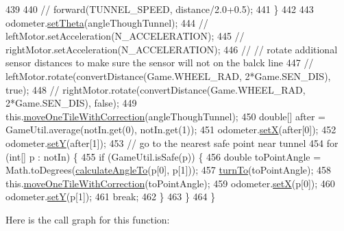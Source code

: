 \begin{DoxyCode}
439        
440 \textcolor{comment}{//        forward(TUNNEL\_SPEED, distance/2.0+0.5);}
441       \}
442 
443     odometer.\hyperlink{classca_1_1mcgill_1_1ecse211_1_1odometer_1_1_odometer_data_a419b8f07c2c5374411c8e62298e9a402}{setTheta}(angleThoughTunnel);
444 \textcolor{comment}{//    leftMotor.setAcceleration(N\_ACCELERATION);}
445 \textcolor{comment}{//    rightMotor.setAcceleration(N\_ACCELERATION);}
446 \textcolor{comment}{//    // rotate additional sensor distances to make sure the sensor will not on the balck line}
447 \textcolor{comment}{//    leftMotor.rotate(convertDistance(Game.WHEEL\_RAD, 2*Game.SEN\_DIS), true);}
448 \textcolor{comment}{//    rightMotor.rotate(convertDistance(Game.WHEEL\_RAD, 2*Game.SEN\_DIS), false);}
449     this.\hyperlink{classca_1_1mcgill_1_1ecse211_1_1project_1_1_navigation_afbe677941e2bd44e35452e1eff508ae9}{moveOneTileWithCorrection}(angleThoughTunnel);
450     \textcolor{keywordtype}{double}[] after = GameUtil.average(notIn.get(0), notIn.get(1));
451     odometer.\hyperlink{classca_1_1mcgill_1_1ecse211_1_1odometer_1_1_odometer_data_a2911d7215e47f3064defe016b46bfeef}{setX}(after[0]);
452     odometer.\hyperlink{classca_1_1mcgill_1_1ecse211_1_1odometer_1_1_odometer_data_a82986438cd462e66520bc62bb4bd2b75}{setY}(after[1]);
453     \textcolor{comment}{// go to the nearest safe point near tunnel}
454     \textcolor{keywordflow}{for} (\textcolor{keywordtype}{int}[] p : notIn) \{
455       \textcolor{keywordflow}{if} (GameUtil.isSafe(p)) \{
456         \textcolor{keywordtype}{double} toPointAngle = Math.toDegrees(\hyperlink{classca_1_1mcgill_1_1ecse211_1_1project_1_1_navigation_a4376e54162df8f123ca3b52e4fd2f38d}{calculateAngleTo}(p[0], p[1]));
457         \hyperlink{classca_1_1mcgill_1_1ecse211_1_1project_1_1_navigation_a3bbe0645f2b3b3d0986b4a707fb5a00c}{turnTo}(toPointAngle);
458         this.\hyperlink{classca_1_1mcgill_1_1ecse211_1_1project_1_1_navigation_afbe677941e2bd44e35452e1eff508ae9}{moveOneTileWithCorrection}(toPointAngle);
459         odometer.\hyperlink{classca_1_1mcgill_1_1ecse211_1_1odometer_1_1_odometer_data_a2911d7215e47f3064defe016b46bfeef}{setX}(p[0]);
460         odometer.\hyperlink{classca_1_1mcgill_1_1ecse211_1_1odometer_1_1_odometer_data_a82986438cd462e66520bc62bb4bd2b75}{setY}(p[1]);
461         \textcolor{keywordflow}{break};
462       \}
463     \}
464   \}
\end{DoxyCode}
Here is the call graph for this function\+:
\nopagebreak
